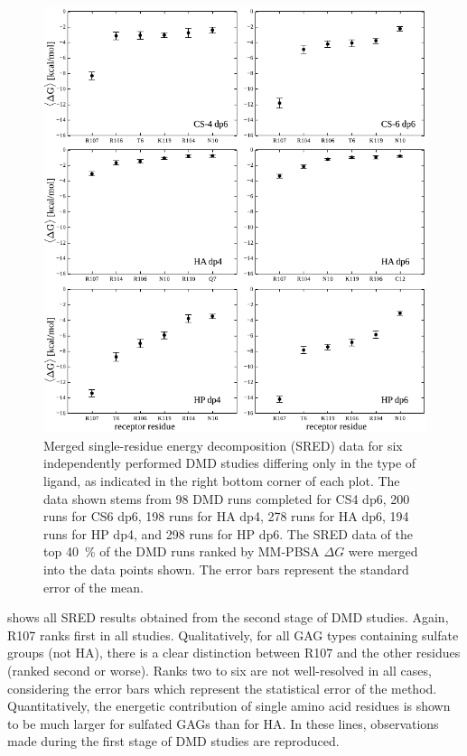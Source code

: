 \begin{figure}
\centering
\includegraphics[width=1.0\textwidth]{gfx/dmdil10/second_stage_all_SREDs_05.pdf}
\caption[]{
Merged single-residue energy decomposition (SRED) data for six independently
performed DMD studies differing only in the type of ligand, as indicated in the
right bottom corner of each plot. The data shown stems from 98 DMD runs
completed for CS4 dp6, 200 runs for CS6 dp6, 198 runs for HA dp4, 278 runs for
HA dp6, 194 runs for HP dp4, and 298 runs for HP dp6. The SRED data of the top
\SI{40}{\percent} of the DMD runs ranked by MM-PBSA $\Delta G$ were merged into
the data points shown. The error bars represent the standard error of the mean.
}
\label{fig:dmdil10:2nd_stage_all_SREDs}
\end{figure}

 shows all SRED results obtained from the
second stage of DMD studies. Again, R107 ranks first in all studies.
Qualitatively, for all GAG types containing sulfate groups (not HA), there is a
clear distinction between R107 and the other residues (ranked second or worse).
Ranks two to six are not well-resolved in all cases, considering the error bars
which represent the statistical error of the method. Quantitatively, the
energetic contribution of single amino acid residues is shown to be much larger
for sulfated GAGs than for HA. In these lines, observations made during the
first stage of DMD studies are reproduced.

